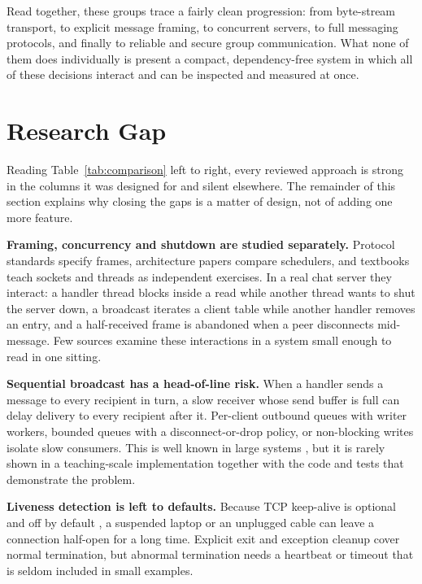 \documentclass[conference]{IEEEtran}
\begin{document}
Read together, these groups trace a fairly clean progression: from byte-stream transport, to explicit message framing, to concurrent servers, to full messaging protocols, and finally to reliable and secure group communication. What none of them does individually is present a compact, dependency-free system in which all of these decisions interact and can be inspected and measured at once.

\section{Research Gap}
Reading Table~\ref{tab:comparison} left to right, every reviewed approach is strong in the columns it was designed for and silent elsewhere. The remainder of this section explains why closing the gaps is a matter of design, not of adding one more feature.

\textbf{Framing, concurrency and shutdown are studied separately.} Protocol standards specify frames, architecture papers compare schedulers, and textbooks teach sockets and threads as independent exercises. In a real chat server they interact: a handler thread blocks inside a read while another thread wants to shut the server down, a broadcast iterates a client table while another handler removes an entry, and a half-received frame is abandoned when a peer disconnects mid-message. Few sources examine these interactions in a system small enough to read in one sitting.

\textbf{Sequential broadcast has a head-of-line risk.} When a handler sends a message to every recipient in turn, a slow receiver whose send buffer is full can delay delivery to every recipient after it. Per-client outbound queues with writer workers, bounded queues with a disconnect-or-drop policy, or non-blocking writes isolate slow consumers. This is well known in large systems \cite{seda}, but it is rarely shown in a teaching-scale implementation together with the code and tests that demonstrate the problem.

\textbf{Liveness detection is left to defaults.} Because TCP keep-alive is optional and off by default \cite{rfc1122}, a suspended laptop or an unplugged cable can leave a connection half-open for a long time. Explicit exit and exception cleanup cover normal termination, but abnormal termination needs a heartbeat or timeout that is seldom included in small examples.
\end{document}
